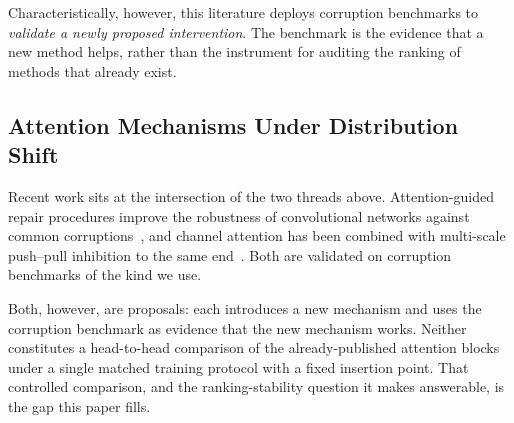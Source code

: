 Characteristically, however, this literature deploys corruption benchmarks to
\emph{validate a newly proposed intervention}. The benchmark is the evidence
that a new method helps, rather than the instrument for auditing the ranking of
methods that already exist.

\subsection{Attention Mechanisms Under Distribution Shift}

Recent work sits at the intersection of the two threads above. Attention-guided
repair procedures improve the robustness of convolutional networks against
common corruptions~\cite{ar2repair2025}, and channel attention has been
combined with multi-scale push--pull inhibition to the same
end~\cite{pushpull2025}. Both are validated on corruption benchmarks of the
kind we use.

Both, however, are proposals: each introduces a new mechanism and uses the
corruption benchmark as evidence that the new mechanism works. Neither
constitutes a head-to-head comparison of the already-published attention blocks
under a single matched training protocol with a fixed insertion point. That
controlled comparison, and the ranking-stability question it makes answerable,
is the gap this paper fills.
